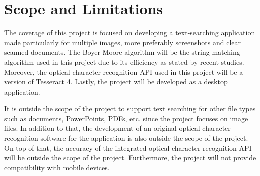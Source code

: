 \part{Scope and Limitations}

\hspace\parindent
The coverage of this project is focused on developing a text-searching application made particularly for multiple images, more preferably screenshots and clear scanned documents. The Boyer-Moore algorithm will be the string-matching algorithm used in this project due to its efficiency as stated by recent studies. Moreover, the optical character recognition API used in this project will be a version of Tesseract 4. Lastly, the project will be developed as a desktop application.

\hfill

It is outside the scope of the project to support text searching for other file types such as documents, PowerPoints, PDFs, etc. since the project focuses on image files. In addition to that, the development of an original optical character recognition software for the application is also outside the scope of the project. On top of that, the accuracy of the integrated optical character recognition API will be outside the scope of the project. Furthermore, the project will not provide compatibility with mobile devices.
